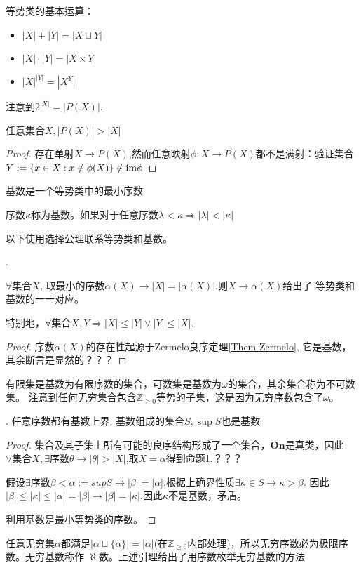 等势类的基本运算：
\begin{itemize}
    \item $|X|+|Y|=|X \sqcup Y|$
    \item $|X|\cdot |Y|= |X \times Y|$
    \item $|X|^{|Y|}=|X^Y|$
\end{itemize}
注意到$2^{|X|}=|P(X)|$.

\begin{Them}[Cantor] 任意集合$X, |P(X)|>|X|$
    \begin{proof}
        存在单射$X\rightarrow P(X)$,然而任意映射$\phi :X\rightarrow P(X)$都不是满射：验证集合$Y:=\{x\in X: x\notin \phi(X)\} \notin \text{im} \space \phi$
    \end{proof}
\end{Them}

\begin{Def}[基数与序数的关系]基数是一个等势类中的最小序数

    序数$\kappa$称为基数。如果对于任意序数$\lambda < \kappa \Rightarrow |\lambda|<|\kappa|$
\end{Def}

以下使用选择公理联系等势类和基数。
\begin{Prop}.

    $\forall \text{集合}X$, 取最小的序数$\alpha(X)\rightarrow |X|=|\alpha(X)|$.则$X\rightarrow \alpha(X)$给出了 等势类和基数的一一对应。

    特别地，$\forall \text{集合}X,Y\Rightarrow |X|\leq |Y| \vee |Y|\leq |X|$.
    \begin{proof}
        序数$\alpha(X)$的存在性起源于Zermelo良序定理\ref{Them Zermelo}, 它是基数，其余断言是显然的？？？
    \end{proof}
\end{Prop}
    有限集是基数为有限序数的集合，可数集是基数为$\omega$的集合，其余集合称为不可数集。
    注意到任何无穷集合包含$\mathbb{Z}_{\geq 0}$等势的子集，这是因为无穷序数包含了$\omega$。
\begin{Lem}[].
    任意序数都有基数上界;
    基数组成的集合$S, \sup{S}$也是基数
    \begin{proof}
        集合及其子集上所有可能的良序结构形成了一个集合，$\mathbf{On}$是真类，因此$\forall \text{集合} X,\exists \text{序数}\theta \rightarrow |\theta |>|X|$,取$X=\alpha$得到命题1.？？？

        假设$\exists \text{序数}\beta< \alpha:=sup{S} \rightarrow |\beta |=|\alpha |$.根据上确界性质$\exists \kappa \in S\rightarrow \kappa > \beta$.
        因此$|\beta|\leq |\kappa|\leq |\alpha |=|\beta|\rightarrow |\beta |=|\kappa|$,因此$\kappa$不是基数，矛盾。

        利用基数是最小等势类的序数。
    \end{proof}
\end{Lem}
    任意无穷集$\alpha$都满足$|\alpha \sqcup \{\alpha \}|=|\alpha |$(在$\mathbb{Z}_{\geq 0}$内部处理)，所以无穷序数必为极限序数。无穷基数称作 $\aleph$数。上述引理给出了用序数枚举无穷基数的方法

